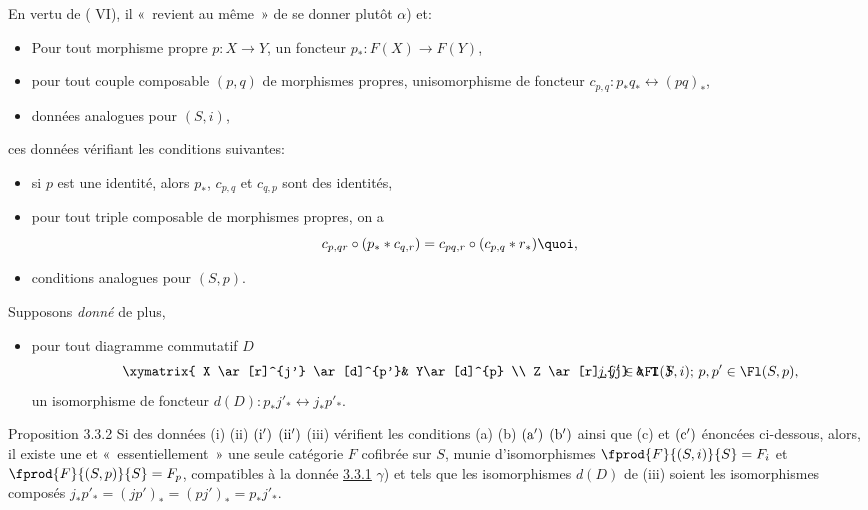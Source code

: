 \documentclass[10pt]{../fichiers-configuration-latex/smfart}
\begin{document}
En vertu de ( VI), il « revient au même » de se donner plutôt $\alpha$) et:
\begin{itemize}
\item[(i)] Pour tout morphisme propre $p:X\rightarrow Y$, un foncteur
$p_{\ast}:F(X)\rightarrow F(Y)$,

\item[(ii)] pour tout couple composable $(p,q)$ de morphismes propres,
un\pageoriginale isomorphisme de foncteur
$c_{p,q}:p_{\ast}q_{\ast}\leftrightarrow (pq)_{\ast}$,

\item[(i\sisi{}{'}) et (ii\sisi{)'}{')},] données analogues pour $(S,i)$,
\end{itemize}
ces données vérifiant les conditions suivantes:
\begin{itemize}
\item[(a)] si $p$ est une identité, alors $p_{\ast}$, $c_{p,q}$ et
$c_{q,p}$ sont des identités,

\item[(b)] pour tout triple composable de morphismes propres, on a
\[
c_{p,qr}\circ (p_{\ast}\ast c_{q,r})=c_{pq,r}\circ (c_{p,q}\ast
r_{\ast}){\quoi},
\]

\item[(a\sisi{)'}{')} et (b\sisi{)'}{')},] conditions analogues pour $(S,p)$.
\end{itemize}

Supposons \emph{donné} de plus,
\begin{itemize}
\item[(iii)] pour tout diagramme commutatif $D$
\[
\vcenter{
\xymatrix{
X \ar[r]^{j'} \ar[d]^{p'}& Y\ar[d]^{p} \\
Z \ar[r]_{j}             &           T
}}\quad j,j' \in \Fl(S,i)\text{; }
  p,p' \in \Fl(S,p),
\]
un isomorphisme de foncteur $d(D):p_{\ast}j'_{\ast}\leftrightarrow
j_{\ast}p'_{\ast}$.
\end{itemize}

\begin{enonce*}{Proposition 3.3.2}
Si des données {\rm (i) (ii) ${\rm (i')}$ ${\rm (ii')}$ (iii)}
vérifient les conditions {\rm (a) (b) ${\rm (a')}$ ${\rm (b')}$} ainsi
que {\rm(c)} et ${\rm (c')}$ énoncées ci-dessous, alors, il existe une
et « essentiellement »  une seule catégorie $F$ cofibrée sur $S$,
munie d'isomorphismes $\fprod{F}{(S,i)}{S}=F_i$ et
$\fprod{F}{(S,p)}{S}=F_p$, compatibles à la donnée \hyperref[XVII.subsubsec3.3.1]{3.3.1} $\gamma$)
et tels que les isomorphismes $d(D)$ de {\rm(iii)} soient les
isomorphismes composés
$j_{\ast}p'_{\ast}=(jp')_{\ast}=(pj')_{\ast}=p_{\ast}j'_{\ast}$.
\end{enonce*}
\end{document}
